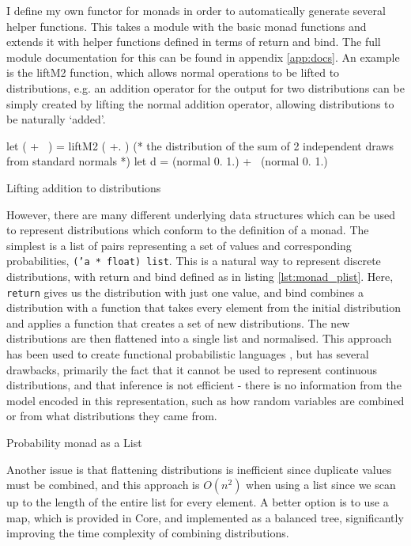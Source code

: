 I define my own functor for monads in order to automatically generate several helper functions. This takes a module with the basic monad functions and extends it with helper functions defined in terms of return and bind. The full module documentation for this can be found in appendix \ref{app:docs}. An example is the liftM2 function, which allows normal operations to be lifted to distributions, e.g. an addition operator for the output for two distributions can be simply created by lifting the normal addition operator, allowing distributions to be naturally `added'.

\begin{listing}
\begin{ocamlcode-in}
let ( +~ ) = liftM2 ( +. )
(* the distribution of the sum of 2 independent draws from standard normals *)
let d = (normal 0. 1.) +~ (normal 0. 1.)
\end{ocamlcode-in}
\caption{Lifting addition to distributions}
\end{listing}

However, there are many different underlying data structures which can be used to represent distributions which conform to the definition of a monad. The simplest is a list of pairs representing a set of values and corresponding probabilities, \texttt{('a * float) list}. This is a natural way to represent discrete distributions, with return and bind defined as in listing \ref{lst:monad_plist}. Here, \texttt{return} gives us the distribution with just one value, and bind combines a distribution with a function that takes every element from the initial distribution and applies a function that creates a set of new distributions. The new distributions are then flattened into a single list and normalised. This approach has been used to create functional probabilistic languages \cite{erwig}, but has several drawbacks, primarily the fact that it cannot be used to represent continuous distributions, and that inference is not efficient - there is no information from the model encoded in this representation, such as how random variables are combined or from what distributions they came from.

\begin{listing}[!ht]
	\caption{Probability monad as a List}
	\label{lst:monad_plist}
\end{listing}

Another issue is that flattening distributions is inefficient since duplicate values must be combined, and this approach is $O(n^2)$ when using a list since we scan up to the length of the entire list for every element. A better option is to use a map, which is provided in Core, and implemented as a balanced tree, significantly improving the time complexity of combining distributions.

